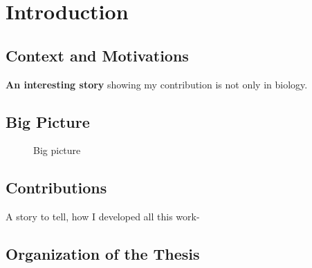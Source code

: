 \chapter{Introduction}
\section{Context and Motivations}
\textbf{An interesting story} showing my contribution is not only in biology.
\section{Big Picture}
\begin{figure}
    
    \caption{Big picture}
\end{figure}

\section{Contributions}
A story to tell, how I developed all this work-
\section{Organization of the Thesis}